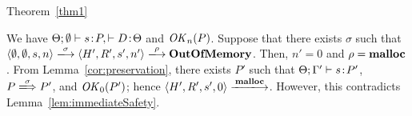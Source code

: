 \begin{pfof}{Theorem~\ref{thm1}}

We have \(\Theta;\emptyset \vdash s\!:\! P, \vdash D\!:\! \Theta\) and
\(\mathit{OK}_n(P)\).
Suppose that there exists \(\sigma\) such that \(\langle \emptyset,
\emptyset, s, n\rangle \xlongrightarrow{\sigma} \langle H', R', s',
n'\rangle \xlongrightarrow{\rho} \OVERFLOW\).  Then, \(n' = 0\) and
\(\rho = \mathbf{malloc}\).  From Lemma~\ref{cor:preservation}, there exists
\(P'\) such that \(\Theta; \Gamma' \vdash s \!:\! P'\), \(P
\xLongrightarrow{\sigma} P'\), and \(\mathit{OK}_0(P')\); hence \(\langle H',
R', s', 0\rangle \xlongrightarrow{\Malloc}\).  However, this
contradicts Lemma~\ref{lem:immediateSafety}.




\end{pfof}
